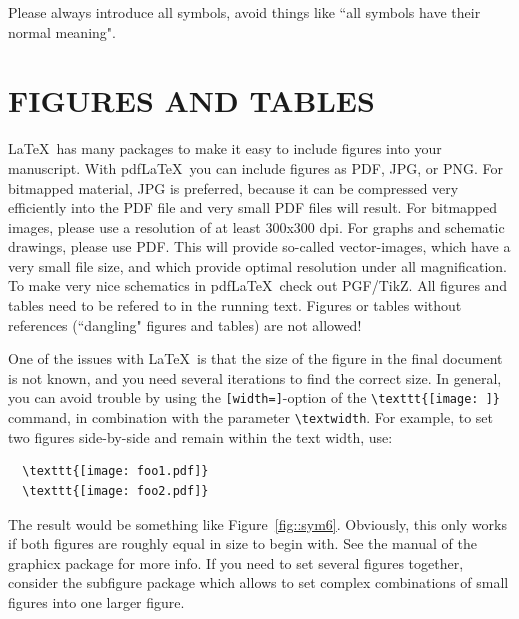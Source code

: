 \documentclass[12pt]{article}
\begin{document}
Please always introduce all symbols, avoid things like ``all symbols have their normal meaning".

%
\section{FIGURES AND TABLES} 
\label{sect::floats}

\LaTeX\ has many packages to make it easy to include figures into your manuscript. With pdf\LaTeX\, you can include figures as PDF, JPG, or PNG. For bitmapped material, JPG is preferred, because it can be compressed very efficiently into the PDF file and very small PDF files will result. For bitmapped images, please use a resolution of at least 300x300 dpi. For graphs and schematic drawings, please use PDF. This will provide so-called vector-images, which have a very small file size, and which provide optimal resolution under all magnification. To make very nice schematics in pdf\LaTeX\, check out PGF/TikZ. All figures and tables need to be refered to in the running text. Figures or tables without references (``dangling" figures and tables) are not allowed!

One of the issues with \LaTeX\ is that the size of the figure in the final document is not known, and you need several iterations to find the correct size. In general, you can avoid trouble by using the \texttt{[width=]}-option of the \verb|\texttt{[image: ]}| command, in combination with the parameter \verb|\textwidth|. For example, to set two figures side-by-side and remain within the text width, use: 

\begin{verbatim}
  \texttt{[image: foo1.pdf]}
  \texttt{[image: foo2.pdf]}
\end{verbatim}

The result would be something like Figure~\ref{fig::sym6}. Obviously, this only works if both figures are roughly equal in size to begin with. See the manual of the graphicx package for more info. If you need to set several figures together, consider the subfigure package which allows to set complex combinations of small figures into one larger figure.
\end{document}

